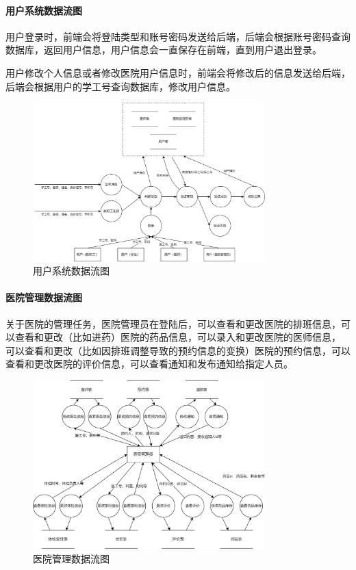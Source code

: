 \documentclass{article}
\begin{document}
\paragraph{用户系统数据流图}

用户登录时，前端会将登陆类型和账号密码发送给后端，后端会根据账号密码查询数据库，返回用户信息，用户信息会一直保存在前端，直到用户退出登录。

用户修改个人信息或者修改医院用户信息时，前端会将修改后的信息发送给后端，后端会根据用户的学工号查询数据库，修改用户信息。

\begin{figure}[H]
    \centering
    \includegraphics[width=0.8\textwidth]{images/user_dataflow.png}
    \caption{用户系统数据流图}
\end{figure}

\paragraph{医院管理数据流图}

关于医院的管理任务，医院管理员在登陆后，可以查看和更改医院的排班信息，可以查看和更改（比如进药）医院的药品信息，可以录入和更改医院的医师信息，
可以查看和更改（比如因排班调整导致的预约信息的变换）医院的预约信息，可以查看和更改医院的评价信息，可以查看通知和发布通知给指定人员。

\begin{figure}[H]
    \centering
    \includegraphics[width=0.8\textwidth]{images/doctorAdmin_dataflow.png}
    \caption{医院管理数据流图}
\end{figure}
\end{document}
